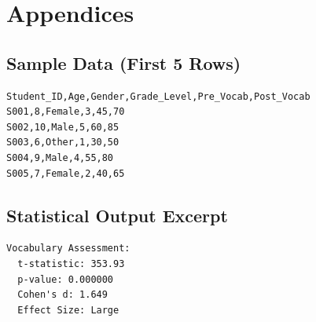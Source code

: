 \documentclass{article}
\begin{document}
\section*{Appendices}
\subsection*{Sample Data (First 5 Rows)}
\begin{verbatim}
Student_ID,Age,Gender,Grade_Level,Pre_Vocab,Post_Vocab
S001,8,Female,3,45,70
S002,10,Male,5,60,85
S003,6,Other,1,30,50
S004,9,Male,4,55,80
S005,7,Female,2,40,65
\end{verbatim}

\subsection*{Statistical Output Excerpt}
\begin{verbatim}
Vocabulary Assessment:
  t-statistic: 353.93
  p-value: 0.000000
  Cohen's d: 1.649
  Effect Size: Large
\end{verbatim}



\end{document}

